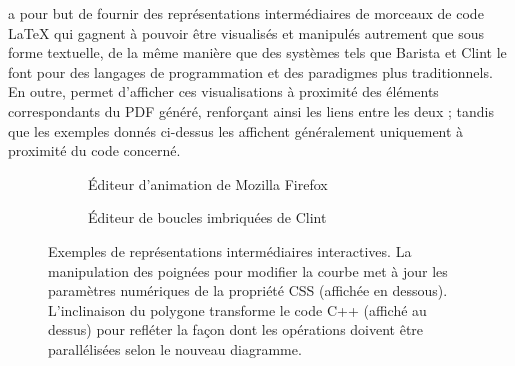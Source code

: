 \iLaTeX{} a pour but de fournir des représentations intermédiaires de morceaux de code \LaTeX{} qui gagnent à pouvoir être visualisés et manipulés autrement que sous forme textuelle, de la même manière que des systèmes tels que Barista et Clint le font pour des langages de programmation et des paradigmes plus traditionnels.
En outre, \iLaTeX{} permet d'afficher ces visualisations à proximité des éléments correspondants du PDF généré, renforçant ainsi les liens entre les deux ; tandis que les exemples donnés ci-dessus les affichent généralement uniquement à proximité du code concerné.

\begin{figure}[ht]
    \center
    \begin{subfigure}[t]{0.49\linewidth}
        \centering{}
        \caption{Éditeur d'animation de Mozilla Firefox}
        \label{subfig:firefox-anim-editor}
    \end{subfigure}
    \begin{subfigure}[t]{0.49\linewidth}
        \centering{}
        \caption{Éditeur de boucles imbriquées de Clint~\cite{zinenko2015manipulating}}
        \label{subfig:clint}
    \end{subfigure}
    
    \caption{Exemples de représentations intermédiaires interactives.  La manipulation des poignées pour modifier la courbe met à jour les paramètres numériques de la propriété CSS (affichée en dessous).  L'inclinaison du polygone transforme le code C++ (affiché au dessus) pour refléter la façon dont les opérations doivent être parallélisées selon le nouveau diagramme.}
    \label{fig:intermediate-representations-examples}
\end{figure}





